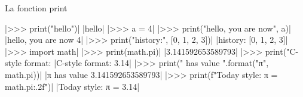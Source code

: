 \documentclass[dvipsnames]{beamer}
\begin{document}
\begin{frame}
    [fragile]{La fonction print}

    |>>> print("hello")|\vspace{-1em}
    |hello|\vspace{-.5em}
    |>>> a = 4|\vspace{-1em}
    |>>> print("hello, you are now", a)|\vspace{-1em}
    |hello, you are now 4|\vspace{-.5em}
    |>>> print("history:", [0, 1, 2, 3])|\vspace{-1em}
    |history: [0, 1, 2, 3]|\vspace{-.5em}
    |>>> import math|\vspace{-1em}
    |>>> print(math.pi)|\vspace{-1em}
    |3.141592653589793|\vspace{-.5em}
    |>>> print("C-style format: %
    |C-style format: 3.14|\vspace{-.5em}
    |>>> print("{} has value {}".format("π", math.pi))|\vspace{-1em}
    |π has value 3.141592653589793|\vspace{-.5em}
    |>>> print(f"Today style: π = {math.pi:.2f}")|\vspace{-1em}
    |Today style: π = 3.14|\vspace{-.5em}

\end{frame}
\end{document}
